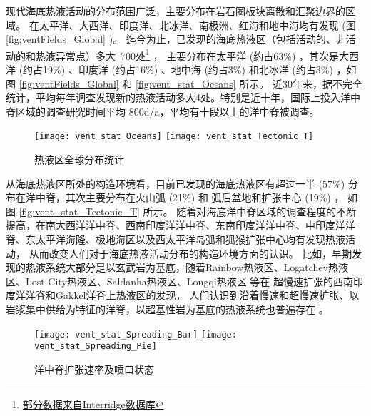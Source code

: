 现代海底热液活动的分布范围广泛，主要分布在岩石圈板块离散和汇聚边界的区域。
在太平洋、大西洋、印度洋、北冰洋、南极洲、红海和地中海均有发现 (图 \ref{fig:ventFields_Global} )。
迄今为止，已发现的海底热液区（包括活动的、非活动的和热液异常点）多大~700处\footnote{\href{https://vents-data.interridge.org} {部分数据来自Interridge数据库} } ，
主要分布在太平洋 (约占63\%) ，其次是大西洋 (约占19\%) 、印度洋 (约占16\%) 、地中海 (约占3\%) 和北冰洋 (约占3\%) ，如图 \ref{fig:ventFields_Global} 和 \ref{fig:vent_stat_Oceans} 所示。
近30年来，据不完全统计，平均每年调查发现新的热液活动多大4处。特别是近十年，国际上投入洋中脊区域的调查研究时间平均 800d/a，平均有十段以上的洋中脊被调查。

\begin{figure} [htbp]
	\centering%
	{\texttt{[image: vent\_stat\_Oceans]} } 
	\hspace{0.0\textwidth} 
	{\texttt{[image: vent\_stat\_Tectonic\_T]} } 
	\caption{热液区全球分布统计} 
	\label{fig:vent_stat_Ocean_Tectonic} 
\end{figure} 

从海底热液区所处的构造环境看，目前已发现的海底热液区有超过一半 (57\%) 分布在洋中脊，其次主要分布在火山弧 (21\%) 和 弧后盆地和扩张中心 (19\%) ， 如图 \ref{fig:vent_stat_Tectonic_T} 所示。
随着对海底洋中脊区域的调查程度的不断提高，在南大西洋洋中脊、西南印度洋洋中脊、东南印度洋洋中脊、中印度洋洋脊、东太平洋海隆、极地海区以及西太平洋岛弧和狐猴扩张中心均有发现热液活动，
从而改变人们对于海底热液活动分布的构造环境方面的认识。
比如，早期发现的热液系统大部分是以玄武岩为基底，随着Rainbow热液区、Logatchev热液区、Lost City热液区、Saldanha热液区、Longqi热液区 \citep{tao2012first} 等在
超慢速扩张的西南印度洋洋脊和Gakkel洋脊上热液区的发现，
人们认识到沿着慢速和超慢速扩张、以岩浆集中供给为特征的洋脊，以超基性岩为基底的热液系统也普遍存在  \citep{schmidt2007geochemistry} 。


\begin{figure} [htbp]
	\centering%
	{\texttt{[image: vent\_stat\_Spreading\_Bar]} } 
	\hspace{0.0\textwidth} 
	{\texttt{[image: vent\_stat\_Spreading\_Pie]} } 
	\caption{洋中脊扩张速率及喷口状态} 
	\label{fig:vent_stat_spreading_T} 
\end{figure} 

